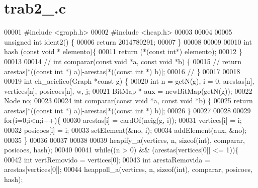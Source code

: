 \section{trab2\+\_.\+c}
\label{trab2__2014780291_8c_source}

\begin{DoxyCode}
00001 \textcolor{preprocessor}{#include <graph.h>}
00002 \textcolor{preprocessor}{#include <heap.h>}
00003 
00004 
00005 \textcolor{keywordtype}{unsigned} \textcolor{keywordtype}{int} ident2() \{
00006     \textcolor{keywordflow}{return} 2014780291;
00007 \}
00008 
00009 
00010 \textcolor{keywordtype}{int} hash (\textcolor{keyword}{const} \textcolor{keywordtype}{void} * elemento)\{
00011     \textcolor{keywordflow}{return} (*(\textcolor{keyword}{const} \textcolor{keywordtype}{int}*) elemento);
00012 \}
00013 
00014  \textcolor{comment}{// int comparar(const void *a, const void *b) \{}
00015  \textcolor{comment}{//        return arestas[*((const int *) a)]-arestas[*((const int *) b)];}
00016  \textcolor{comment}{//    \}}
00017 
00018 
00019 \textcolor{keywordtype}{int} eh_aciclico(Graph *\textcolor{keyword}{const} g) \{
00020     \textcolor{keywordtype}{int} n = getN(g), i = 0, arestas[n], vertices[n], posicoes[n], w, j;
00021     BitMap * aux = newBitMap(getN(g)); 
00022     Node no;
00023 
00024     \textcolor{keywordtype}{int} comparar(\textcolor{keyword}{const} \textcolor{keywordtype}{void} *a, \textcolor{keyword}{const} \textcolor{keywordtype}{void} *b) \{
00025         \textcolor{keywordflow}{return} arestas[*((\textcolor{keyword}{const} \textcolor{keywordtype}{int} *) a)]-arestas[*((\textcolor{keyword}{const} \textcolor{keywordtype}{int} *) b)];
00026     \}
00027 
00028 
00029     \textcolor{keywordflow}{for}(i=0;i<n;i++)\{
00030         arestas[i] = cardOf(neig(g, i));
00031         vertices[i] = i;
00032         posicoes[i] = i;
00033         setElement(&no, i);
00034         addElement(aux, &no);
00035     \}    
00036 
00037  
00038 
00039     heapify_a(vertices, n, \textcolor{keyword}{sizeof}(\textcolor{keywordtype}{int}), comparar, posicoes, hash);
00040 
00041     \textcolor{keywordflow}{while}((n > 0) && (arestas[vertices[0]] <= 1))\{        
00042         \textcolor{keywordtype}{int} vertRemovido = vertices[0];
00043         \textcolor{keywordtype}{int} arestaRemovida = arestas[vertices[0]];
00044         heappoll_a(vertices, n, \textcolor{keyword}{sizeof}(\textcolor{keywordtype}{int}), comparar, posicoes, hash);

\end{DoxyCode}
